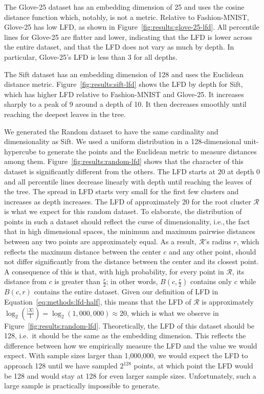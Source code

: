 The Glove-25 dataset has an embedding dimension of 25 and uses the cosine distance function which, notably, is not a metric.
Relative to Fashion-MNIST, Glove-25 has low LFD, as shown in Figure~\ref{fig:results:glove-25-lfd}.
All percentile lines for Glove-25 are flatter and lower, indicating that the LFD is lower across the entire dataset, and that the LFD does not vary as much by depth.
In particular, Glove-25's LFD is less than 3 for all depths.

The Sift dataset has an embedding dimension of 128 and uses the Euclidean distance metric.
Figure~\ref{fig:results:sift-lfd} shows the LFD by depth for Sift, which has higher LFD relative to Fashion-MNIST and Glove-25.
It increases sharply to a peak of 9 around a depth of 10.
It then decreases smoothly until reaching the deepest leaves in the tree.

We generated the Random dataset to have the same cardinality and dimensionality as Sift.
We used a uniform distribution in a 128-dimensional unit-hypercube to generate the points and the Euclidean metric to measure distances among them.
Figure~\ref{fig:results:random-lfd} shows that the character of this dataset is significantly different from the others.
The LFD starts at 20 at depth 0 and all percentile lines decrease linearly with depth until reaching the leaves of the tree.
The spread in LFD starts very small for the first few clusters and increases as depth increases.
The LFD of approximately 20 for the root cluster $\mathcal{R}$ is what we expect for this random dataset.
To elaborate, the distribution of points in such a dataset should reflect the curse of dimensionality, i.e.,\,the fact that in high dimensional spaces, the minimum and maximum pairwise distances between any two points are approximately equal.
As a result, $\mathcal{R}$'s radius $r$, which reflects the maximum distance between the center $c$ and any other point, should not differ significantly from the distance between the center and its closest point.
A consequence of this is that, with high probability, for every point in $\mathcal{R}$, its distance from $c$ is greater than $\tfrac{r}{2}$;
in other words, $B(c, \tfrac{r}{2})$ contains only $c$ while $B(c, r)$ contains the entire dataset.
Given our definition of LFD in Equation~\ref{eq:methods:lfd-half}, this means that the LFD of $\mathcal{R}$ is approximately $\log_2(\frac{|X|}{1}) = \log_2(1,000,000) \approx 20$, which is what we observe in Figure~\ref{fig:results:random-lfd}.
Theoretically, the LFD of this dataset should be 128, i.e.\, it should be the same as the embedding dimension.
This reflects the difference between how we empirically measure the LFD and the value we would expect.
With sample sizes larger than 1,000,000, we would expect the LFD to approach 128 until we have sampled $2^128$ points, at which point the LFD would be 128 and would stay at 128 for even larger sample sizes.
Unfortunately, such a large sample is practically impossible to generate.

